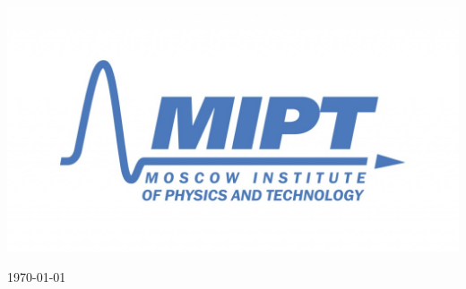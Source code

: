\begin{titlepage}
\begin{bottompar}
	\begin{center}
		\includegraphics[width = 80 mm]{logo.jpg}
	\end{center}
	{\large \today}

\end{bottompar}
\vfill %

\end{titlepage}
